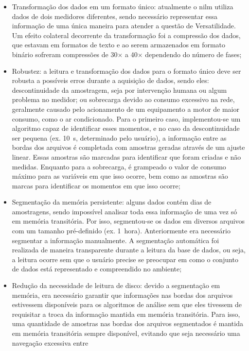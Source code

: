 \begin{itemize}
\item Transformação dos dados em um formato único: atualmente o
\gls{nilm} utiliza dados de dois medidores diferentes, sendo
necessário representar essa informação de uma única maneira para
atender a questão de Versatilidade. Um efeito colateral decorrente da
transformação foi a compressão dos dados, que estavam em formatos de
texto e ao serem armazenados em formato binário sofreram compressões de
30$\times$ a 40$\times$ dependendo do número de fases;
\item Robustez: a leitura e transformação dos dados para o formato
único deve ser robusta a possíveis erros durante a aquisição de dados,
sendo eles: descontinuidade da amostragem, seja por intervenção humana
ou algum problema no medidor; ou sobrecarga devido ao consumo
excessivo na rede, geralmente causado pelo acionamento de um equipamento
a motor de maior consumo, como o ar condicionado. Para o primeiro
caso, implementou-se um algoritmo capaz de identificar esses momentos,
e no caso da descontinuidade ser pequena (ex. 10~s, determinado pelo
usuário), a informação entre as bordas dos arquivos é completada com
amostras geradas através de um ajuste linear. Essas amostras são
marcadas para identificar que foram criadas e não medidas. Enquanto
para a sobrecarga, é grampeado o valor de consumo máximo para as
variáveis em que isso ocorre, bem como as amostras são marcas para
identificar os momentos em que isso ocorre;
\item Segmentação da memória persistente: alguns dados contém dias de
amostragens, sendo impossível analisar toda essa informação de uma vez
só em memória transitória. Por isso, segmentou-se os dados em diversos
arquivos com um tamanho pré-definido (ex. 1~hora). Anteriormente era
necessário segmentar a informação manualmente. A segmentação
automática foi realizada de maneira transparente durante a leitura da
base de dados, ou seja, a leitura ocorre sem que o usuário precise se
preocupar em como o conjunto de dados está representado e compreendido
no ambiente;
\item Redução da necessidade de leitura de disco: devido a segmentação
em memória, era necessário garantir que informações nas bordas dos
arquivos estivessem disponíveis para os algoritmos de análise sem que
eles tivessem de requisitar a troca da informação mantida em memória
transitória. Para isso, uma quantidade de amostras nas bordas dos
arquivos segmentados é mantida em memória transitória sempre
disponível, evitando que seja necessário uma navegação excessiva entre

\end{itemize}

